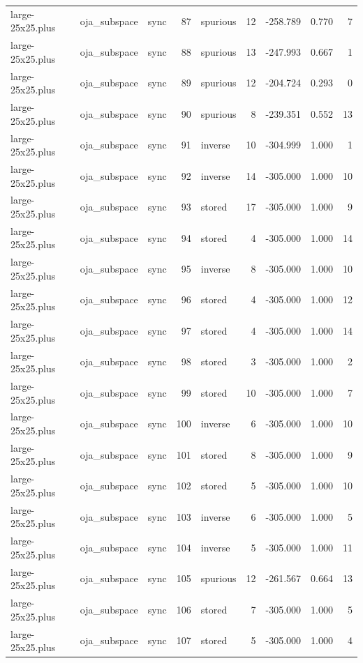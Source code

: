 \begin{tabular}{lllrlrrrr}
large-25x25.plus & oja\_subspace & sync & 87 & spurious & 12 & -258.789 & 0.770 & 7 \\
large-25x25.plus & oja\_subspace & sync & 88 & spurious & 13 & -247.993 & 0.667 & 1 \\
large-25x25.plus & oja\_subspace & sync & 89 & spurious & 12 & -204.724 & 0.293 & 0 \\
large-25x25.plus & oja\_subspace & sync & 90 & spurious & 8 & -239.351 & 0.552 & 13 \\
large-25x25.plus & oja\_subspace & sync & 91 & inverse & 10 & -304.999 & 1.000 & 1 \\
large-25x25.plus & oja\_subspace & sync & 92 & inverse & 14 & -305.000 & 1.000 & 10 \\
large-25x25.plus & oja\_subspace & sync & 93 & stored & 17 & -305.000 & 1.000 & 9 \\
large-25x25.plus & oja\_subspace & sync & 94 & stored & 4 & -305.000 & 1.000 & 14 \\
large-25x25.plus & oja\_subspace & sync & 95 & inverse & 8 & -305.000 & 1.000 & 10 \\
large-25x25.plus & oja\_subspace & sync & 96 & stored & 4 & -305.000 & 1.000 & 12 \\
large-25x25.plus & oja\_subspace & sync & 97 & stored & 4 & -305.000 & 1.000 & 14 \\
large-25x25.plus & oja\_subspace & sync & 98 & stored & 3 & -305.000 & 1.000 & 2 \\
large-25x25.plus & oja\_subspace & sync & 99 & stored & 10 & -305.000 & 1.000 & 7 \\
large-25x25.plus & oja\_subspace & sync & 100 & inverse & 6 & -305.000 & 1.000 & 10 \\
large-25x25.plus & oja\_subspace & sync & 101 & stored & 8 & -305.000 & 1.000 & 9 \\
large-25x25.plus & oja\_subspace & sync & 102 & stored & 5 & -305.000 & 1.000 & 10 \\
large-25x25.plus & oja\_subspace & sync & 103 & inverse & 6 & -305.000 & 1.000 & 5 \\
large-25x25.plus & oja\_subspace & sync & 104 & inverse & 5 & -305.000 & 1.000 & 11 \\
large-25x25.plus & oja\_subspace & sync & 105 & spurious & 12 & -261.567 & 0.664 & 13 \\
large-25x25.plus & oja\_subspace & sync & 106 & stored & 7 & -305.000 & 1.000 & 5 \\
large-25x25.plus & oja\_subspace & sync & 107 & stored & 5 & -305.000 & 1.000 & 4 \\

\end{tabular}
